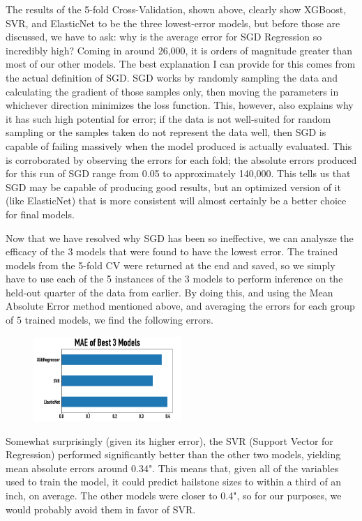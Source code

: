 \documentclass[fleqn,10pt]{SelfArx} %
\begin{document}
The results of the 5-fold Cross-Validation, shown above, clearly show XGBoost, SVR, and ElasticNet to be the three lowest-error models, but before those are discussed, we have to ask: why is the average error for SGD Regression so incredibly high? Coming in around 26,000, it is orders of magnitude greater than most of our other models. The best explanation I can provide for this comes from the actual definition of SGD. SGD works by randomly sampling the data and calculating the gradient of those samples only, then moving the parameters in whichever direction minimizes the loss function. This, however, also explains why it has such high potential for error; if the data is not well-suited for random sampling or the samples taken do not represent the data well, then SGD is capable of failing massively when the model produced is actually evaluated. This is corroborated by observing the errors for each fold; the absolute errors produced for this run of SGD range from 0.05 to approximately 140,000. This tells us that SGD may be capable of producing good results, but an optimized version of it (like ElasticNet) that is more consistent will almost certainly be a better choice for final models.

Now that we have resolved why SGD has been so ineffective, we can analysze the efficacy of the 3 models that were found to have the lowest error. The trained models from the 5-fold CV were returned at the end and saved, so we simply have to use each of the 5 instances of the 3 models to perform inference on the held-out quarter of the data from earlier. By doing this, and using the Mean Absolute Error method mentioned above, and averaging the errors for each group of 5 trained models, we find the following errors. 

\begin{figure}[H]
\includegraphics[width=0.5\textwidth, center=8.5cm]{"plots/3_mae.png"} 
\end{figure}

Somewhat surprisingly (given its higher error), the SVR (Support Vector for Regression) performed significantly better than the other two models, yielding mean absolute errors around 0.34". This means that, given all of the variables used to train the model, it could predict hailstone sizes to within a third of an inch, on average. The other models were closer to 0.4", so for our purposes, we would probably avoid them in favor of SVR.
\end{document}
